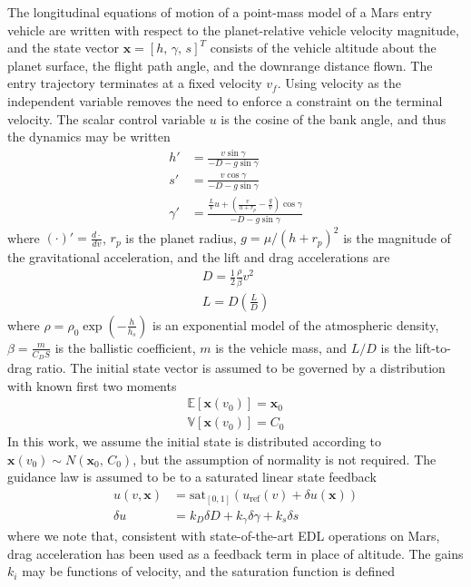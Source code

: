 \documentclass[journal ]{new-aiaa}
\newcommand{\state}{\ensuremath{\mathbf{x}}}
\newcommand{\ur}{\ensuremath{u_{\mathrm{ref}}}}
\newcommand{\E}[1]{\mathbb{E}\left[#1\right]}
\newcommand{\V}[1]{\mathbb{V}[#1]}
\newcommand{\cov}{C}
\begin{document}
The longitudinal equations of motion of a point-mass model of a Mars entry vehicle are written with respect to the planet-relative vehicle velocity magnitude, and the state vector $\state=[h,\,\gamma,\, s]^T$ consists of the vehicle altitude about the planet surface, the flight path angle, and the downrange distance flown. The entry trajectory terminates at a fixed velocity $v_f$. Using velocity as the independent variable removes the need to enforce a constraint on the terminal velocity. The scalar control variable $u$ is the cosine of the bank angle, and thus the dynamics may be written
\begin{align}
h' &= \frac{v\sin\gamma}{-D - g\sin\gamma} \label{eq_dynamics_altitude}\\
s' &= \frac{v\cos\gamma}{-D - g\sin\gamma} \\
\gamma' &= \frac{\frac{L}{V}u + \left(\frac{v}{h+r_p}-\frac{g}{v}\right)\cos\gamma}{-D - g\sin\gamma} \label{eq_dynamics_fpa}
\end{align}
where $(\cdot)' = \frac{d\cdot}{dv}$, $r_p$ is the planet radius, $g=\mu/(h+r_p)^2$ is the magnitude of the gravitational acceleration, and the lift and drag accelerations are
\begin{align}
D = \frac{1}{2}\frac{\rho}{\beta} v^2 \\
L = D(\frac{L}{D})
\end{align}
where $\rho=\rho_0\exp\left(-\frac{h}{h_s}\right)$ is an exponential model of the atmospheric density, $\beta=\frac{m}{C_DS}$ is the ballistic coefficient, $m$ is the vehicle mass, and $L/D$ is the lift-to-drag ratio.
The initial state vector is assumed to be governed by a distribution with known first two moments
 \begin{align}
 \E{\state(v_0)} = \state_0 \label{eq_ic_mean}\\ 
 \V{\state(v_0)} = \cov_0 \label{eq_ic_cov}
 \end{align}
In this work, we assume the initial state is distributed according to $\state(v_0)\sim N(\state_0,\,\cov_0)$, but the assumption of normality is not required.
The guidance law is assumed to be to a saturated linear state feedback 
\begin{align}
u(v,\state) &= \mathrm{sat}_{[0,1]}\left(\ur(v) + \delta u(\state)\right)\\
\delta u &= k_D\delta D + k_{\gamma}\delta\gamma + k_s\delta s \label{eq_feedback}
\end{align}
where we note that, consistent with state-of-the-art EDL operations on Mars, drag acceleration has been used as a feedback term in place of altitude. The gains $k_i$ may be functions of velocity, and the saturation function is defined
\end{document}
